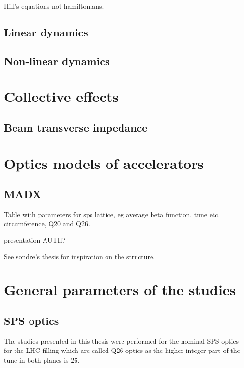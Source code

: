 Hill's equations not hamiltonians.

\subsection{Linear dynamics}
\subsection{Non-linear dynamics}

\section{Collective effects}
\subsection{Beam transverse impedance}

\section{Optics models of accelerators}
\subsection*{MADX}
Table with parameters for sps lattice, eg average beta function, tune etc. circumference, Q20 and Q26.

presentation AUTH?


See sondre's thesis for inspiration on the structure.
\section{General parameters of the studies}
\subsection{SPS optics}\label{subsec:SPS_optics_model}
 The studies presented in this thesis were performed for the nominal SPS optics for the LHC filling which are called Q26 optics as the higher integer part of the tune in both planes is 26. 

